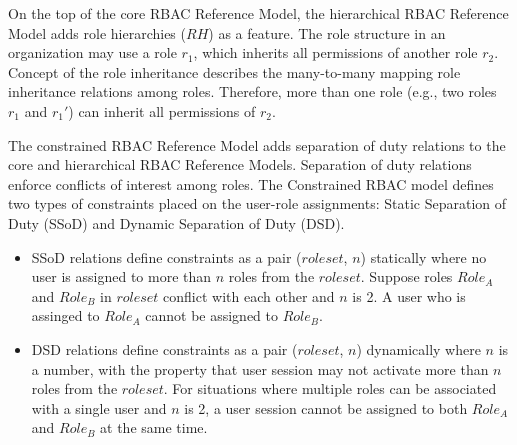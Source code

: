 On the top of the core RBAC Reference Model, the hierarchical RBAC Reference Model adds role hierarchies ($RH$) as a feature. 
The role structure in an organization may use
a role $r_1$, which inherits all permissions of another role $r_2$.
Concept of the role inheritance describes the many-to-many mapping role inheritance relations among roles. Therefore, more than one role (e.g., two roles $r_1$ and $r_1'$) can inherit all permissions of $r_2$.

The constrained RBAC Reference Model adds separation of duty relations to the core and hierarchical RBAC Reference Models. Separation of duty relations enforce conflicts of interest among roles. 
The Constrained RBAC model defines two types of constraints placed on the user-role assignments:
Static Separation of Duty (SSoD) and Dynamic Separation of Duty (DSD).

\begin{itemize}
\item SSoD relations define constraints as a pair ($role set$, $n$) statically where no user is assigned to more than $n$ roles from the $role set$.
Suppose roles $Role_A$ and $Role_B$ in $role set$ conflict with each other and $n$ is 2. A user who is assinged to $Role_A$ cannot be assigned to $Role_B$.
	
\item DSD relations define constraints as a pair ($role set$, $n$) dynamically where $n$ is a number, with the property that
user session may not activate more than $n$ roles from the $role set$.
For situations where multiple roles can be associated with a single user and $n$ is 2, a user session cannot be assigned to both $Role_A$ and $Role_B$ at the same time. 
\end{itemize}

